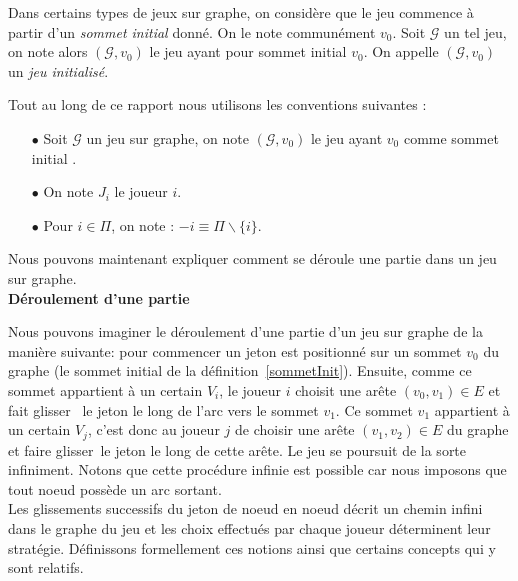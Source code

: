 \begin{defi}\label{sommetInit}
	Dans certains types de jeux sur graphe, on considère que le jeu commence à partir d'un \textit{sommet initial} donné. On le note communément $v_{0}$. Soit $\mathcal{G}$ un tel jeu, on note alors $(\mathcal{G},v_{0})$ le jeu ayant pour sommet initial $v_{0}$. On appelle $(\mathcal{G},v_{0})$ un \textit{jeu initialisé}.
\end{defi}

\begin{notations}
	Tout au long de ce rapport nous utilisons les conventions suivantes :
	\begin{enumerate}
		\item[$\bullet$] Soit $\mathcal{G}$ un jeu sur graphe, on note $(\mathcal{G},v_{0})$ le jeu ayant $v_{0}$ comme sommet initial .
		
		\item[$\bullet$] On note $J_{i}$  le joueur $i$.
		
		\item[$\bullet$] Pour $i\in \Pi$, on note : $-i\equiv \Pi\backslash \{ i\} $.
	\end{enumerate}
\end{notations}

Nous pouvons maintenant expliquer comment se déroule une partie dans un jeu sur graphe.\\



\noindent\textbf{Déroulement d'une partie}\label{derPar}

Nous pouvons imaginer le déroulement d'une partie d'un jeu sur graphe de la manière suivante: pour commencer un jeton est positionné sur un sommet $v_{0}$ du graphe (le sommet initial de la définition~\ref{sommetInit}). Ensuite, comme ce sommet appartient à un certain $V_{i}$, le joueur $i$ choisit une arête $(v_{0},v_{1}) \in E$ et fait \og glisser \fg~le jeton le long de l'arc vers le sommet $v_{1}$. Ce sommet $v_{1}$ appartient à un certain $V_{j}$, c'est donc au joueur $j$ de choisir une arête $(v_{1},v_{2})\in E$ du graphe et faire \og glisser\fg~le jeton le long de cette arête. Le jeu se poursuit de la sorte infiniment. Notons que cette procédure infinie est possible car nous imposons que tout noeud possède un arc sortant. \\

Les glissements successifs du jeton de noeud en noeud décrit un chemin infini dans le graphe du jeu et les choix effectués par chaque joueur  déterminent leur stratégie. Définissons formellement ces notions ainsi que certains concepts qui y sont relatifs.

